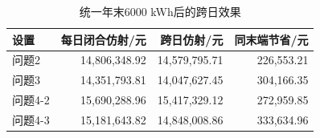 \begin{table}[H]\centering\small\caption{统一年末6000 kWh后的跨日效果}\label{tab:fixedend}
\begin{tabular}{lrrr}\toprule
设置 & 每日闭合仿射/元 & 跨日仿射/元 & 同末端节省/元\\\midrule
问题2 & 14,806,348.92 & 14,579,795.71 & 226,553.21\\
问题3 & 14,351,793.81 & 14,047,627.45 & 304,166.35\\
问题4-2 & 15,690,288.96 & 15,417,329.12 & 272,959.85\\
问题4-3 & 15,181,643.82 & 14,848,008.86 & 333,634.96\\
\bottomrule\end{tabular}\end{table}
